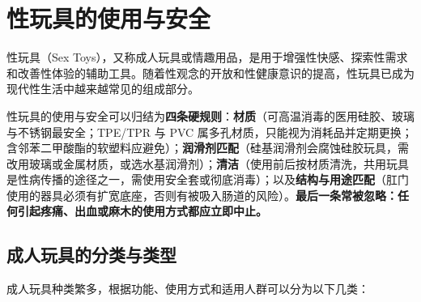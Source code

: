 \documentclass[12pt,UTF8]{ctexbook}
\begin{document}
\section{性玩具的使用与安全}

性玩具（Sex Toys），又称成人玩具或情趣用品，是用于增强性快感、探索性需求和改善性体验的辅助工具。随着性观念的开放和性健康意识的提高，性玩具已成为现代性生活中越来越常见的组成部分。


性玩具的使用与安全可以归结为\textbf{四条硬规则}：\textbf{材质}（可高温消毒的医用硅胶、玻璃与不锈钢最安全；TPE/TPR 与 PVC 属多孔材质，只能视为消耗品并定期更换；含邻苯二甲酸酯的软塑料应避免）；\textbf{润滑剂匹配}（硅基润滑剂会腐蚀硅胶玩具，需改用玻璃或金属材质，或选水基润滑剂）；\textbf{清洁}（使用前后按材质清洗，共用玩具是性病传播的途径之一，需使用安全套或彻底消毒）；以及\textbf{结构与用途匹配}（肛门使用的器具必须有扩宽底座，否则有被吸入肠道的风险）。\textbf{最后一条常被忽略：任何引起疼痛、出血或麻木的使用方式都应立即中止。}

\subsection{成人玩具的分类与类型}

成人玩具种类繁多，根据功能、使用方式和适用人群可以分为以下几类：
\end{document}
